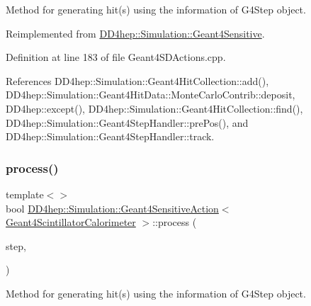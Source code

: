 Method for generating hit(s) using the information of G4\+Step object. 



Reimplemented from \hyperlink{class_d_d4hep_1_1_simulation_1_1_geant4_sensitive_a9a9463a6c29a66dad43a52ffc9f7838d}{D\+D4hep\+::\+Simulation\+::\+Geant4\+Sensitive}.



Definition at line 183 of file Geant4\+S\+D\+Actions.\+cpp.



References D\+D4hep\+::\+Simulation\+::\+Geant4\+Hit\+Collection\+::add(), D\+D4hep\+::\+Simulation\+::\+Geant4\+Hit\+Data\+::\+Monte\+Carlo\+Contrib\+::deposit, D\+D4hep\+::except(), D\+D4hep\+::\+Simulation\+::\+Geant4\+Hit\+Collection\+::find(), D\+D4hep\+::\+Simulation\+::\+Geant4\+Step\+Handler\+::pre\+Pos(), and D\+D4hep\+::\+Simulation\+::\+Geant4\+Step\+Handler\+::track.

\hypertarget{class_d_d4hep_1_1_simulation_1_1_geant4_sensitive_action_a8a81f39616ed1de4b54b57f3f719320f}{}\label{class_d_d4hep_1_1_simulation_1_1_geant4_sensitive_action_a8a81f39616ed1de4b54b57f3f719320f} 
\subsubsection{\texorpdfstring{process()}{process()}\hspace{0.1cm}{\footnotesize\ttfamily [4/7]}}
{\footnotesize\ttfamily template$<$$>$ \\
bool \hyperlink{class_d_d4hep_1_1_simulation_1_1_geant4_sensitive_action}{D\+D4hep\+::\+Simulation\+::\+Geant4\+Sensitive\+Action}$<$ \hyperlink{struct_d_d4hep_1_1_simulation_1_1_geant4_scintillator_calorimeter}{Geant4\+Scintillator\+Calorimeter} $>$\+::process (\begin{DoxyParamCaption}\item[{G4\+Step $\ast$}]{step,  }\item[{G4\+Touchable\+History $\ast$}]{ }\end{DoxyParamCaption})\hspace{0.3cm}{\ttfamily [virtual]}}



Method for generating hit(s) using the information of G4\+Step object. 



